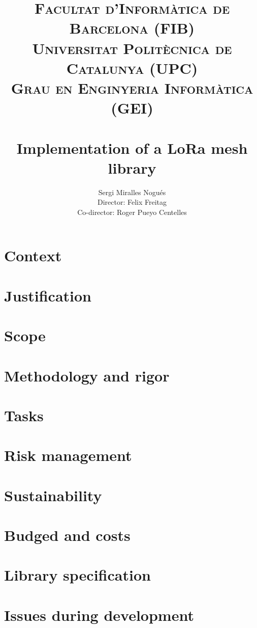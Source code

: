 \documentclass[11pt,a4paper,titlepage]{article}
\author{ \LARGE Sergi Miralles Nogués\vspace{4mm} \\ Director: Felix Freitag  \\ Co-director: Roger Pueyo Centelles}
\title{\vspace{-15mm}\textsc{\Large Facultat d'Informàtica de Barcelona (FIB)}\\\textsc{\Large Universitat Politècnica de Catalunya (UPC)\vspace{5mm}}\\\textsc{\large Grau en Enginyeria Informàtica (GEI)}\\\textsc{\large}\\{\vspace{30mm}\huge \bfseries \fontfamily{lmss}\selectfont Implementation of a LoRa mesh library}  \\ { \LARGE \textsc{}}}
\begin{document}
	\maketitle
    
    \tableofcontents
    
    \newpage
    
    \section{Context}
    
    \section{Justification}
    
    \section{Scope}
    
    \section{Methodology and rigor}
    
    \section{Tasks}
    
    \section{Risk management}
    
    \section{Sustainability}
    
    \section{Budged and costs}
    
    \section{Library specification}
    
    \section{Issues during development}
    
\end{document}
